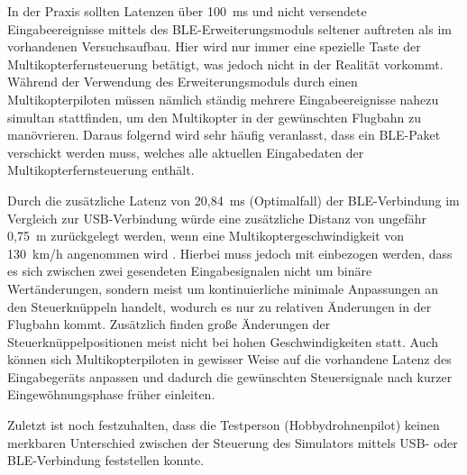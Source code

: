 In der Praxis sollten Latenzen über 100~ms und nicht versendete Eingabeereignisse mittels des \ac{BLE}-Erweiterungsmoduls seltener auftreten als im vorhandenen Versuchsaufbau. Hier wird nur immer eine spezielle Taste der Multikopterfernsteuerung betätigt, was jedoch nicht in der Realität vorkommt. Während der Verwendung des Erweiterungsmoduls durch einen Multikopterpiloten müssen nämlich ständig mehrere Eingabeereignisse nahezu simultan stattfinden, um den Multikopter in der gewünschten Flugbahn zu manövrieren. Daraus folgernd wird sehr häufig veranlasst, dass ein \ac{BLE}-Paket verschickt werden muss, welches alle aktuellen Eingabedaten der Multikopterfernsteuerung enthält.

Durch die zusätzliche Latenz von 20,84~ms (Optimalfall) der \ac{BLE}-Verbindung im Vergleich zur USB-Verbindung würde eine zusätzliche Distanz von ungefähr 0,75~m zurückgelegt werden, wenn eine Multikoptergeschwindigkeit von 130~km/h angenommen wird \cites{droneSpeed1}{droneSpeed2}{droneSpeed3}. Hierbei muss jedoch mit einbezogen werden, dass es sich zwischen zwei gesendeten Eingabesignalen nicht um binäre Wertänderungen, sondern meist um kontinuierliche minimale Anpassungen an den Steuerknüppeln handelt, wodurch es nur zu relativen Änderungen in der Flugbahn kommt. Zusätzlich finden große Änderungen der Steuerknüppelpositionen meist nicht bei hohen Geschwindigkeiten statt. Auch können sich Multikopterpiloten in gewisser Weise auf die vorhandene Latenz des Eingabegeräts anpassen und dadurch die gewünschten Steuersignale nach kurzer Eingewöhnungsphase früher einleiten.

Zuletzt ist noch festzuhalten, dass die Testperson (Hobbydrohnenpilot) keinen merkbaren Unterschied zwischen der Steuerung des Simulators mittels USB- oder \ac{BLE}-Verbindung feststellen konnte.